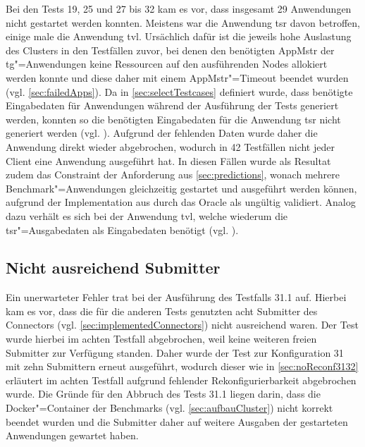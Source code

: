Bei den Tests 19, 25 und 27 bis 32 kam es vor, dass insgesamt 29 Anwendungen nicht gestartet werden konnten.
Meistens war die Anwendung \acl{tsr} davon betroffen, einige male die Anwendung \acl{tvl}.
Ursächlich dafür ist die jeweils hohe Auslastung des Clusters in den Testfällen zuvor, bei denen den benötigten \ac{AppMstr} der \acl{tg}"=Anwendungen keine Ressourcen auf den ausführenden Nodes allokiert werden konnte und diese daher mit einem \ac{AppMstr}"=Timeout beendet wurden (vgl. \autoref{sec:failedApps}).
Da in \autoref{sec:selectTestcases} definiert wurde, dass benötigte Eingabedaten für Anwendungen während der Ausführung der Tests generiert werden, konnten so die benötigten Eingabedaten für die Anwendung \acl{tsr} nicht generiert werden (vgl. ).
Aufgrund der fehlenden Daten wurde daher die Anwendung direkt wieder abgebrochen, wodurch in 42 Testfällen nicht jeder Client eine Anwendung ausgeführt hat.
In diesen Fällen wurde als Resultat zudem das Constraint der Anforderung aus \autoref{sec:predictions}, wonach mehrere Benchmark"=Anwendungen gleichzeitig gestartet und ausgeführt werden können, aufgrund der Implementation aus  durch das Oracle als ungültig validiert.
Analog dazu verhält es sich bei der Anwendung \acl{tvl}, welche wiederum die \acl{tsr}"=Ausgabedaten als Eingabedaten benötigt (vgl. ).

\subsection{Nicht ausreichend Submitter}
\label{sec:notEnoughSubmitter}

Ein unerwarteter Fehler trat bei der Ausführung des Testfalls 31.1 auf.
Hierbei kam es vor, dass die für die anderen Tests genutzten acht Submitter des Connectors (vgl. \autoref{sec:implementedConnectors}) nicht ausreichend waren.
Der Test wurde hierbei im achten Testfall abgebrochen, weil keine weiteren freien Submitter zur Verfügung standen.
Daher wurde der Test zur Konfiguration 31 mit zehn Submittern erneut ausgeführt, wodurch dieser wie in \autoref{sec:noReconf3132} erläutert im achten Testfall aufgrund fehlender Rekonfigurierbarkeit abgebrochen wurde.
Die Gründe für den Abbruch des Tests 31.1 liegen darin, dass die Docker"=Container der Benchmarks (vgl. \autoref{sec:aufbauCluster}) nicht korrekt beendet wurden und die Submitter daher auf weitere Ausgaben der gestarteten Anwendungen gewartet haben.
